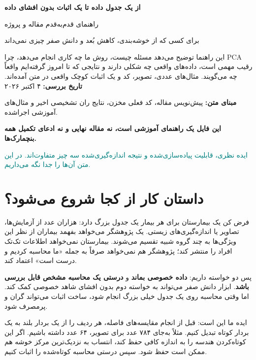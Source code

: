 \documentclass[11pt,a4paper]{article}
\newcommand{\lesson}[1]{\clearpage\section{#1}}
\begin{document}
\begin{titlepage}
\vspace*{18mm}
{\Huge\bfseries از یک جدول داده تا یک اثبات بدون افشای داده}\par
\vspace{12mm}
{\LARGE راهنمای قدم‌به‌قدم مقاله و پروژه}\par
\vspace{5mm}
{\LARGE{}}\par
\vspace{14mm}
{\large برای کسی که از خوشه‌بندی، کاهش بُعد و دانش صفر چیزی نمی‌داند}\par
\vspace{12mm}
این راهنما توضیح می‌دهد مسئله چیست، روش ما چه کاری انجام می‌دهد، چرا PCA رقیب مهمی است، داده‌های واقعی چه شکلی دارند و نتایجی که تا امروز گرفته‌ایم واقعاً چه می‌گویند. مثال‌های عددی، تصویر، کد و یک اثبات کوچک واقعی در متن آمده‌اند.
\vspace{8mm}
\textbf{تاریخ بررسی:} ۴ اکتبر ۲۰۲۶\par
\textbf{مبنای متن:} پیش‌نویس مقاله، کد فعلی مخزن، نتایج ران تشخیصی اخیر و مثال‌های آموزشی اجراشده.\par
\textbf{این فایل یک راهنمای آموزشی است، نه مقاله نهایی و نه ادعای تکمیل همه بنچمارک‌ها.}\par
\vfill
\textcolor{teal}{\large ایده نظری، قابلیت پیاده‌سازی‌شده و نتیجه اندازه‌گیری‌شده سه چیز متفاوت‌اند. در این متن آن‌ها را جدا نگه می‌داریم.}
\end{titlepage}
\begingroup\small\linespread{1.08}\selectfont\tableofcontents\endgroup

\lesson{داستان کار از کجا شروع می‌شود؟}
فرض کن یک بیمارستان برای هر بیمار یک جدول بزرگ دارد: هزاران عدد از آزمایش‌ها، تصاویر یا اندازه‌گیری‌های زیستی. یک پژوهشگر می‌خواهد بفهمد بیماران از نظر این ویژگی‌ها به چند گروه شبیه تقسیم می‌شوند. بیمارستان نمی‌خواهد اطلاعات تک‌تک افراد را منتشر کند؛ پژوهشگر هم نمی‌خواهد صرفاً به جمله «ما محاسبه کردیم و درست است» اعتماد کند.

پس دو خواسته داریم: \textbf{داده خصوصی بماند} و \textbf{درستی یک محاسبه مشخص قابل بررسی باشد}. ابزار دانش صفر می‌تواند به خواسته دوم بدون افشای شاهد خصوصی کمک کند. اما وقتی محاسبه روی یک جدول خیلی بزرگ انجام شود، ساخت اثبات می‌تواند گران و پرمصرف شود.

ایده ما این است: قبل از انجام مقایسه‌های فاصله، هر ردیف را از یک بردار بلند به یک بردار کوتاه تبدیل کنیم. مثلاً به‌جای ۷۸۴ عدد برای تصویر، ۶۴ عدد داشته باشیم. اگر این کوتاه‌کردن هندسه را به اندازه کافی حفظ کند، انتساب به نزدیک‌ترین مرکز خوشه هم ممکن است حفظ شود. سپس درستی محاسبه کوتاه‌شده را اثبات کنیم.
\end{document}
